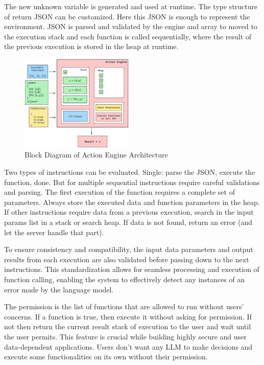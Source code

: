 \documentclass[conference]{IEEEtran}
\begin{document}
The new unknown variable is generated and used at runtime. The type structure
of return JSON can be customized. Here this JSON is enough to represent the
environment. JSON is parsed and validated by the engine and array to moved to
the execution stack and each function is called sequentially, where the result
of the previous execution is stored in the heap at runtime.

\begin{figure}[htbp]
    \centering
    \includegraphics[width=0.48\textwidth]{images/action-engine.png}
    \caption{Block Diagram of Action Engine Architecture}
    \label{fig}
\end{figure}

Two types of instructions can be evaluated. Single: parse the JSON, execute the
function, done. But for multiple sequential instructions require careful
validations and parsing. The first execution of the function requires a
complete set of parameters. Always store the executed data and function
parameters in the heap. If other instructions require data from a previous
execution, search in the input params list in a stack or search heap. If data
is not found, return an error (and let the server handle that part).

To ensure consistency and compatibility, the input data parameters and output
results from each execution are also validated before passing down to the next
instructions. This standardization allows for seamless processing and execution
of function calling, enabling the system to effectively detect any instances of
an error made by the language model.

The permission is the list of functions that are allowed to run without users'
concerns. If a function is true, then execute it without asking for permission.
If not then return the current result stack of execution to the user and wait
until the user permits. This feature is crucial while building highly secure
and user data-dependent applications. Users don’t want any LLM to make
decisions and execute some functionalities on its own without their permission.
\end{document}
